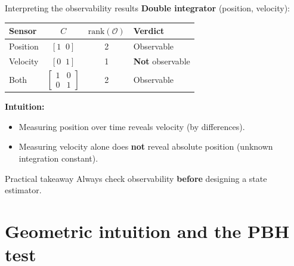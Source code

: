 \documentclass[aspectratio=169,10pt]{beamer}
\newcommand{\Ocal}{\mathcal{O}}
\begin{document}
\begin{frame}{Interpreting the observability results}
\textbf{Double integrator} (position, velocity):

\medskip
\begin{center}
\renewcommand{\arraystretch}{1.3}
\begin{tabular}{lccl}
\toprule
Sensor & $C$ & $\mathrm{rank}(\Ocal)$ & Verdict \\
\midrule
Position & $[1\;\;0]$ & 2 & Observable \\
Velocity & $[0\;\;1]$ & 1 & \textbf{Not} observable \\
Both     & $\begin{bmatrix}1&0\\0&1\end{bmatrix}$ & 2 & Observable \\
\bottomrule
\end{tabular}
\end{center}

\medskip
\textbf{Intuition:}
\begin{itemize}
  \item Measuring position over time reveals velocity (by differences).
  \item Measuring velocity alone does \textbf{not} reveal absolute position
        (unknown integration constant).
\end{itemize}

\begin{notebox}{Practical takeaway}
Always check observability \textbf{before} designing a state estimator.
\end{notebox}
\end{frame}

\section{Geometric intuition and the PBH test}
\end{document}
